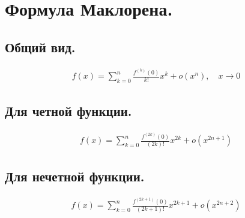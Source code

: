 \documentclass[a4paper,14pt]{article}
\begin{document}
    \section{Формула Маклорена.}
    \subsection{Общий вид.}
    \begin{align}
        f(x)=\sum_{k=0}^{n} \frac{f^{(k)}(0)}{k!} x^k+o(x^n), \quad x \rightarrow 0
    \end{align}
    \subsection{Для четной функции.}
    \begin{align}
        f(x)=\sum_{k=0}^{n} \frac{f^{(2k)}(0)}{(2k)!} x^{2k} + o(x^{2n+1})
    \end{align}
    \subsection{Для нечетной функции.}
    \begin{align}
        f(x)=\sum_{k=0}^{n} \frac{f^{(2k+1)}(0)}{(2k+1)!} x^{2k+1} + o(x^{2n+2})
    \end{align}
\end{document}
